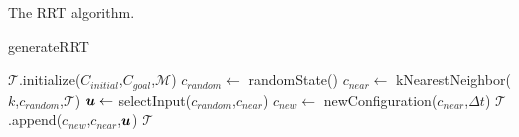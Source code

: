 \begin{table}
  \captionsetup{justification=centering}
  \caption{The RRT algorithm.}
  \label{tab:RRT_table}
\begin{algorithm}[H]
  \caption{generateRRT}
  \label{algo:RRT} 
  \DontPrintSemicolon
  $\mathcal{T}$.initialize($C_{initial}$,$C_{goal}$,$\mathcal{M}$)\;\label{ln:initialize_tree}
  {
    $c_{random}\gets$ randomState()\;\label{ln:random_generator}
    $c_{near} \gets$ kNearestNeighbor($k$,$c_{random}$,$\mathcal{T}$)\;\label{ln:knn}
    $\vb*{u} \gets$ selectInput($c_{random}$,$c_{near}$)\;\label{ln:direction}
    $c_{new} \gets$ newConfiguration($c_{near}$,$\Delta t$)\;\label{ln:assign_new}
    $\mathcal{T}$.append($c_{new}$,$c_{near}$,$\vb*{u}$)\;
  }
    \KwRet $\mathcal{T}$\;

  \end{algorithm}
\end{table}
%
